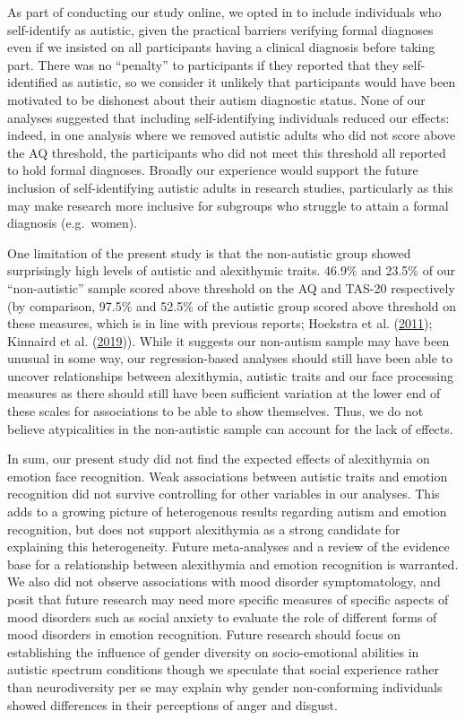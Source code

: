 \documentclass[
]{article}
\begin{document}
As part of conducting our study online, we opted in to include individuals who self-identify as autistic, given the practical barriers verifying formal diagnoses even if we insisted on all participants having a clinical diagnosis before taking part. There was no ``penalty'' to participants if they reported that they self-identified as autistic, so we consider it unlikely that participants would have been motivated to be dishonest about their autism diagnostic status. None of our analyses suggested that including self-identifying individuals reduced our effects: indeed, in one analysis where we removed autistic adults who did not score above the AQ threshold, the participants who did not meet this threshold all reported to hold formal diagnoses. Broadly our experience would support the future inclusion of self-identifying autistic adults in research studies, particularly as this may make research more inclusive for subgroups who struggle to attain a formal diagnosis (e.g.~women).

One limitation of the present study is that the non-autistic group showed surprisingly high levels of autistic and alexithymic traits. 46.9\% and 23.5\% of our ``non-autistic'' sample scored above threshold on the AQ and TAS-20 respectively (by comparison, 97.5\% and 52.5\% of the autistic group scored above threshold on these measures, which is in line with previous reports; Hoekstra et al. (\protect\hyperlink{ref-hoekstra2011a}{2011}); Kinnaird et al. (\protect\hyperlink{ref-kinnaird2019a}{2019})). While it suggests our non-autism sample may have been unusual in some way, our regression-based analyses should still have been able to uncover relationships between alexithymia, autistic traits and our face processing measures as there should still have been sufficient variation at the lower end of these scales for associations to be able to show themselves. Thus, we do not believe atypicalities in the non-autistic sample can account for the lack of effects.

In sum, our present study did not find the expected effects of alexithymia on emotion face recognition. Weak associations between autistic traits and emotion recognition did not survive controlling for other variables in our analyses. This adds to a growing picture of heterogenous results regarding autism and emotion recognition, but does not support alexithymia as a strong candidate for explaining this heterogeneity. Future meta-analyses and a review of the evidence base for a relationship between alexithymia and emotion recognition is warranted. We also did not observe associations with mood disorder symptomatology, and posit that future research may need more specific measures of specific aspects of mood disorders such as social anxiety to evaluate the role of different forms of mood disorders in emotion recognition. Future research should focus on establishing the influence of gender diversity on socio-emotional abilities in autistic spectrum conditions though we speculate that social experience rather than neurodiversity per se may explain why gender non-conforming individuals showed differences in their perceptions of anger and disgust.
\end{document}

